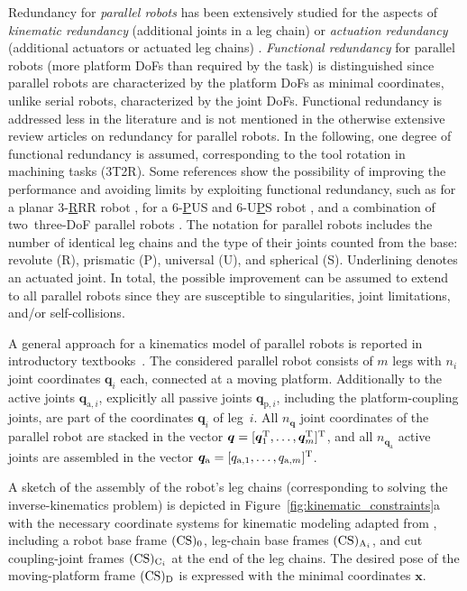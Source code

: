 Redundancy for \emph{parallel robots} has been extensively studied for the aspects of \emph{kinematic redundancy} (additional joints in a leg chain) or \emph{actuation redundancy} (additional actuators or actuated leg chains) \cite{LucesMilBen2017,GosselinSch2018}.
\emph{Functional redundancy} for parallel robots (more platform DoFs than required by the task) is distinguished since parallel robots are characterized by the platform DoFs as minimal coordinates, unlike serial robots, characterized by the joint DoFs.
Functional redundancy is addressed less in the literature and is not mentioned in the otherwise extensive review articles \cite{LucesMilBen2017,GosselinSch2018} on redundancy for parallel robots.
%
In the following, one degree of functional redundancy is assumed, corresponding to the tool rotation in machining tasks (3T2R). %
Some references show the possibility of improving the performance and avoiding limits by exploiting functional redundancy, such as for a planar 3-\underline{R}RR %
%
robot \cite{AlbaGomezWenPam2005,KotlarskiDoHeiOrt2010,AgarwalNasBan2016,GaoCheGaoXia2019}, for a 6-\underline{P}US \cite{OenWan2007} and 6-U\underline{P}S robot \cite{MerletPerDan2000,OenWan2007,Schappler2023_ICINCOLNEE}, and a combination of two~three-DoF parallel robots \cite{CorinaldiAngCal2016}.
The %
%
notation for parallel robots includes the number of identical leg chains and the type of their joints counted from the base: revolute (R),  prismatic (P), universal (U), and spherical (S). Underlining denotes an actuated joint.
In total, the possible improvement can be assumed to extend to all parallel robots since they are susceptible to singularities, joint limitations, and/or self-collisions. %
%


A general approach for a kinematics model of parallel robots is reported in introductory textbooks~\cite{Merlet2006,Gogu2008,BriotKha2015}. %
The considered parallel robot consists of $m$ legs with $n_i$ joint coordinates %
%
$\bm{q}_i$ each, connected at a moving platform.
Additionally to the active joints $\bm{q}_{\mathrm{a},i}$, explicitly all passive joints $\bm{q}_{\mathrm{p},i}$, including the platform-coupling joints, are part of the coordinates $\bm{q}_i$ of leg~$i$.
All $n_{\bm{q}}$ joint coordinates of the parallel robot are stacked in the vector $\bm{q}=[\bm{q}_1^{\mathrm{T}},\dots,\bm{q}_m^{\mathrm{T}}]^{\mathrm{T}}$, and all $n_{\bm{q}_\mathrm{a}}$ active joints are assembled in the vector $\bm{q}_\mathrm{a}=[q_{\mathrm{a},1},\dots,q_{\mathrm{a},m}]^{\mathrm{T}}$. %

A sketch of the assembly of the robot's leg chains (corresponding to solving the inverse-kinematics problem) is depicted in Figure~\ref{fig:kinematic_constraints}a with the necessary coordinate systems for kinematic modeling adapted from \cite{BriotKha2015}, including a robot base frame $(\mathrm{CS})_{0}$, leg-chain base frames $(\mathrm{CS})_{\mathrm{A}_i}$, and cut coupling-joint frames $(\mathrm{CS})_{\mathrm{C}_i}$ at the end of the leg chains.
The desired pose of the moving-platform frame $(\mathrm{CS})_{\mathrm{D}}$ is expressed with the minimal coordinates $\bm{x}$. %

